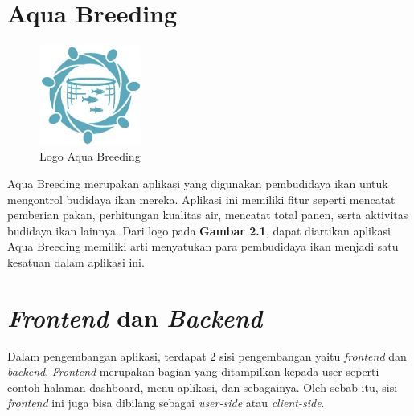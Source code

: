 \begin{spacing}{1.5}

\section{Aqua Breeding}

\begin{figure}[H]
	\centering
	\includegraphics[width=0.3\textwidth]{gambar/logo_aquabreeding.jpeg}
	\caption{Logo Aqua Breeding}
\end{figure}

Aqua Breeding merupakan aplikasi yang digunakan pembudidaya ikan untuk mengontrol budidaya ikan mereka. Aplikasi ini memiliki fitur seperti mencatat pemberian pakan, perhitungan kualitas air, mencatat total panen, serta aktivitas budidaya ikan lainnya. Dari logo pada \textbf{Gambar 2.1}, dapat diartikan aplikasi Aqua Breeding memiliki arti menyatukan para pembudidaya ikan menjadi satu kesatuan dalam aplikasi ini.

\section{\textit{Frontend} dan \textit{Backend}}

Dalam pengembangan aplikasi, terdapat 2 sisi pengembangan yaitu \textit{frontend} dan \textit{backend}. \textit{Frontend} merupakan bagian yang ditampilkan kepada user seperti contoh halaman dashboard, menu aplikasi, dan sebagainya. Oleh sebab itu, sisi \textit{frontend} ini juga bisa dibilang sebagai \textit{user-side} atau \textit{client-side}.


\end{spacing}
